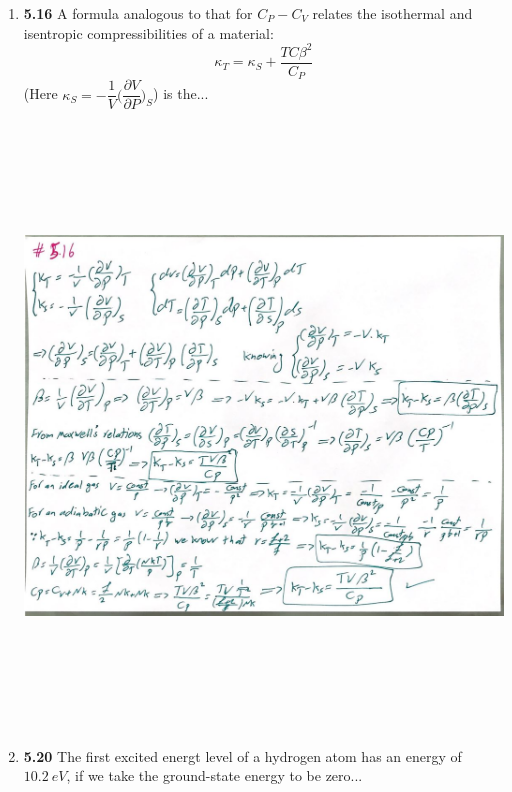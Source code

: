 \documentclass[fleqn]{article}
\begin{document}
  \begin{enumerate}
    \item \textbf{5.16} A formula analogous to that for $C_P-C_V$ relates the isothermal and 
    isentropic compressibilities of a material:
    $$
      \kappa_T=\kappa_S+\dfrac{TC \beta^2}{C_P}
    $$
    (Here $\kappa_S=-\dfrac{1}{V} \bigg( \dfrac{\partial V}{\partial P} \bigg)_S $) is the...

    \begin{center}
      \includegraphics[height=16cm, width=17cm]{516.JPG}
    \end{center}

    \pagebreak

    \item \textbf{5.20} The first excited energt level of a hydrogen atom has an energy of $10.2 ~ eV$, if
    we take the ground-state energy to be zero...


\end{enumerate}
\end{document}
